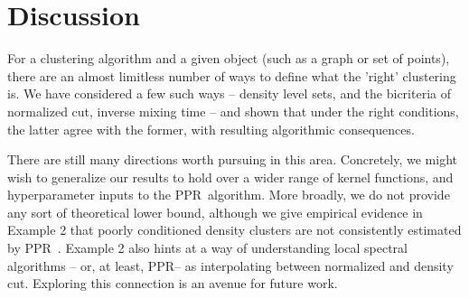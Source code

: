 \documentclass{article}
\newcommand{\1}{\mathbf{1}}
\newcommand{\ppr}{{\sc PPR}}
\newcommand{\pprspace}{{\sc PPR~}}
\theoremstyle{aldenthm}
\theoremstyle{remark}
\begin{document}
\section{Discussion}
For a clustering algorithm and a given object (such as a graph or set of points), there are an almost limitless number of ways to define what the 'right' clustering is. We have considered a few such ways -- density level sets, and the bicriteria of normalized cut, inverse mixing time -- and shown that under the right conditions, the latter agree with the former, with resulting algorithmic consequences.

There are still many directions worth pursuing in this area. Concretely, we might wish to generalize our results to hold over a wider range of kernel functions, and hyperparameter inputs to the \pprspace algorithm. More broadly, we do not provide any sort of theoretical lower bound, although we give empirical evidence in Example 2 that poorly conditioned density clusters are not consistently estimated by \pprspace. Example 2 also hints at a way of understanding local spectral algorithms -- or, at least, \ppr-- as interpolating between normalized and density cut. Exploring this connection is an avenue for future work.

\clearpage



\end{document}
